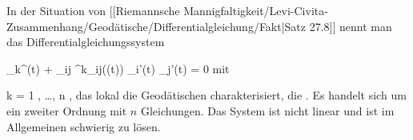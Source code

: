 {}
{

In der Situation von
[[Riemannsche Mannigfaltigkeit/Levi-Civita-Zusammenhang/Geodätische/Differentialgleichung/Fakt|Satz 27.8]]
nennt man das Differentialgleichungssystem

\mavergleichskettedisp
{\vergleichskette
{ \gamma_k^{\prime \prime}(t) + \sum_{ij} \Gamma^k_{ij}(\gamma(t)) \gamma_i'(t) \gamma_j'(t)
}
{ =} { 0
}
{ } {
}
{ } {
}
{ } {
}
}
{}{}{}
mit

\mavergleichskette
{\vergleichskette
{ k
}
{ = }{ 1  , \ldots , n
}
{  }{
}
{    }{
}
{   }{
}
}
{}{}{,}
das lokal die Geodätischen charakterisiert, die  {.} Es handelt sich um ein
zweiter Ordnung mit $n$ Gleichungen. Das System ist nicht linear und ist im Allgemeinen schwierig zu lösen.

}

